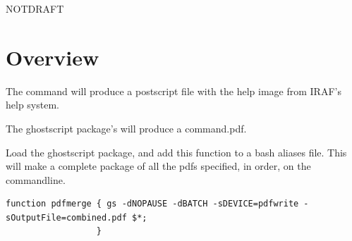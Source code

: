 \documentclass[letter,11pt,oneside]{article}
\def\documentisdraft{NOTDRAFT}
\newcommand{\dhl}[1]{{\color{verbcolor}{\texttt#1}}}
\begin{document}
\setcounter{section}{0}

\ifx\documentisdraft\drafttest
\linenumbers    %
\fi

\section{Overview}

The command \dhl{help <command> dev=ps > command.pdf} will produce a postscript
file with the help image from IRAF's help system.

The ghostscript package's \dhl{ps2pdf command.ps} will produce a command.pdf.

Load the ghostscript package, and add this function to a bash aliases file.
This will make a complete package of all the pdfs specified, in order, on
the commandline.

\begingroup \fontsize{10pt}{10pt}
\selectfont
\begin{verbatim} 
function pdfmerge { gs -dNOPAUSE -dBATCH -sDEVICE=pdfwrite -sOutputFile=combined.pdf $*;
                  }
\end{verbatim}
\endgroup




















\end{document}
